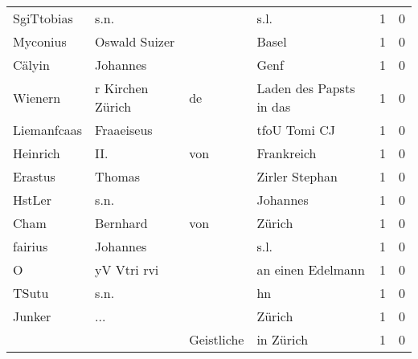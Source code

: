 \begin{center}
\begin{tiny}
\begin{longtabu}{llllrr}
               SgiTtobias &                               s.n. &             &                                        s.l. &          1 &         0 \\
                 Myconius &                      Oswald Suizer &             &                                       Basel &          1 &         0 \\
                   Cälyin &                           Johannes &             &                                        Genf &          1 &         0 \\
                  Wienern &                   r Kirchen Zürich &          de &                     Laden des Papsts in das &          1 &         0 \\
              Liemanfcaas &                         Fraaeiseus &             &                                tfoU Tomi CJ &          1 &         0 \\
                 Heinrich &                                II. &         von &                                  Frankreich &          1 &         0 \\
                  Erastus &                             Thomas &             &                              Zirler Stephan &          1 &         0 \\
                   HstLer &                               s.n. &             &                                    Johannes &          1 &         0 \\
                     Cham &                           Bernhard &         von &                                      Zürich &          1 &         0 \\
                  fairius &                           Johannes &             &                                        s.l. &          1 &         0 \\
                        O &                        yV Vtri rvi &             &                           an einen Edelmann &          1 &         0 \\
                    TSutu &                               s.n. &             &                                          hn &          1 &         0 \\
                   Junker &                                ... &             &                                      Zürich &          1 &         0 \\
                          &                                    &  Geistliche &                                   in Zürich &          1 &         0 \\

\end{longtabu}
\end{tiny}
\end{center}
